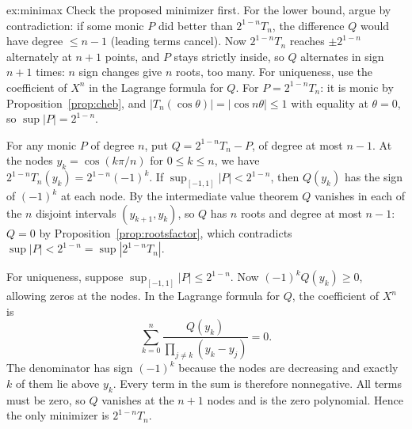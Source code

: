 \begin{solution}{ex:minimax}
\idea Check the proposed minimizer first. For the lower bound, argue by contradiction: if some monic $P$ did better than $2^{1-n}T_n$, the difference $Q$ would have degree $\le n-1$ (leading terms cancel). Now $2^{1-n}T_n$ reaches $\pm2^{1-n}$ alternately at $n+1$ points, and $P$ stays strictly inside, so $Q$ alternates in sign $n+1$ times: $n$ sign changes give $n$ roots, too many. For uniqueness, use the coefficient of $X^n$ in the Lagrange formula for $Q$.
\writeup For $P=2^{1-n}T_n$: it is monic by Proposition~\ref{prop:cheb}, and $|T_n(\cos\theta)|=|\cos n\theta|\le1$ with equality at $\theta=0$, so $\sup|P|=2^{1-n}$.

For any monic $P$ of degree $n$, put $Q=2^{1-n}T_n-P$, of degree at most $n-1$. At the nodes $y_k=\cos(k\pi/n)$ for $0\le k\le n$, we have $2^{1-n}T_n(y_k)=2^{1-n}(-1)^k$. If $\sup_{[-1,1]}|P|<2^{1-n}$, then $Q(y_k)$ has the sign of $(-1)^k$ at each node.
By the intermediate value theorem $Q$ vanishes in each of the $n$ disjoint intervals $(y_{k+1},y_k)$, so $Q$ has $n$ roots and degree at most $n-1$: $Q=0$ by Proposition~\ref{prop:rootsfactor},
which contradicts $\sup|P|<2^{1-n}=\sup|2^{1-n}T_n|$.

For uniqueness, suppose $\sup_{[-1,1]}|P|\le2^{1-n}$. Now $(-1)^kQ(y_k)\ge0$, allowing zeros at the nodes. In the Lagrange formula for $Q$, the coefficient of $X^n$ is
\[
\sum_{k=0}^n\frac{Q(y_k)}{\prod_{j\ne k}(y_k-y_j)}=0.
\]
The denominator has sign $(-1)^k$ because the nodes are decreasing and exactly $k$ of them lie above $y_k$. Every term in the sum is therefore nonnegative. All terms must be zero, so $Q$ vanishes at the $n+1$ nodes and is the zero polynomial. Hence the only minimizer is $2^{1-n}T_n$.
\end{solution}

